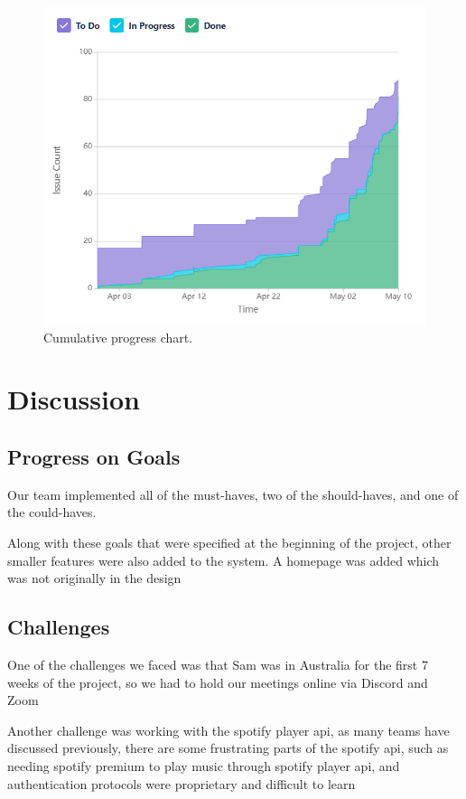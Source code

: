 \documentclass[conference]{IEEEtran}
\begin{document}
\begin{figure}[htbp]
\centerline{\includegraphics[width = \linewidth]{cumulative-flow-diagram.png}}
\caption{Cumulative progress chart.}
\label{fig}
\end{figure}



\section{Discussion}

\subsection{Progress on Goals}
Our team implemented all of the must-haves, two of the should-haves, and one of the could-haves. 

Along with these goals that were specified at the beginning of the project, other smaller features were also added to the system. A homepage was added which was not originally in the design


\subsection{Challenges}
One of the challenges we faced was that Sam was in Australia for the first 7 weeks of the project, so we had to hold our meetings online via Discord and Zoom

Another challenge was working with the spotify player api, as many teams have discussed previously, there are some frustrating parts of the spotify api, such as needing spotify premium to play music through spotify player api, and authentication protocols were proprietary and difficult to learn
\end{document}
